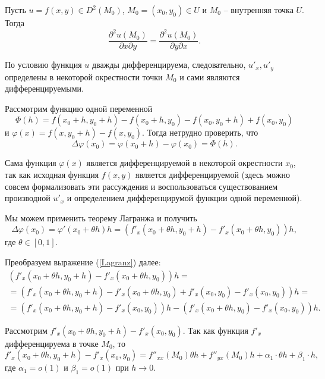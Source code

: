 	\begin{theorem}\label{th1}
		Пусть $u = f(x,y) \in D^2(M_0)$, $M_0 = (x_0, y_0) \in U$ и $M_0$ -- внутренняя точка $U$.
		Тогда
		$$
		\frac {\partial^2 u(M_0)} {\partial x \partial y} = \frac {\partial^2 u(M_0)} {\partial y \partial x}.
		$$
	\end{theorem}
	\begin{Proof}
		По условию функция $u$ дважды дифференцируема, следовательно, $u'_x, u'_y$ определены в некоторой окрестности точки $M_0$ и сами являются дифференцируемыми.
		
		Рассмотрим функцию одной переменной 
		$$
		\Phi(h) = f(x_0+h, y_0+h)-f(x_0+h, y_0)-f(x_0, y_0+h)+f(x_0, y_0)
		$$ 
		и $\varphi(x) = f(x, y_0+h)-f(x, y_0)$.
		Тогда нетрудно проверить, что 
		\begin{equation}\label{delta phi}
		\Delta\varphi(x_0) = \varphi(x_0+h) - \varphi(x_0) = \Phi(h).
		\end{equation}
		
		Сама функция $\varphi(x)$ является дифференцируемой в некоторой окрестности $x_0$, так как исходная функция $f(x, y)$ является дифференцируемой (здесь можно совсем формализовать эти рассуждения и воспользоваться существованием производной $u'_x$ и определением дифференцирумой функции одной переменной).
		
		Мы можем применить теорему Лагранжа и получить
		\begin{equation}\label{Lagranz}
		\Delta \varphi(x_0) = \varphi'(x_0+\theta h)h = (f'_x(x_0+\theta h, y_0+h) - f'_x(x_0+\theta h, y_0))h, 
		\end{equation}
		где $\theta \in [0, 1]$.
		
		Преобразуем выражение (\ref{Lagranz}) далее:
		\begin{multline*}
		\left(f'_x(x_0+\theta h, y_0+h) - f'_x(x_0+\theta h, y_0)\right)h =\\
		= (f'_x(x_0+\theta h, y_0+h) - f'_x(x_0+\theta h, y_0) + f'_x(x_0, y_0) - f'_x(x_0, y_0))h =\\
		= (f'_x(x_0+\theta h, y_0+h) - f'_x(x_0, y_0))h -(f'_x(x_0+\theta h, y_0) - f'_x(x_0, y_0))h.
		\end{multline*}
		
		Рассмотрим $f'_x(x_0+\theta h, y_0+h) - f'_x(x_0, y_0)$. Так как функция $f'_x$ дифференцируема в точке $M_0$, то
		$$
		f'_x(x_0+\theta h, y_0+h) - f'_x(x_0, y_0) = f''_{xx}(M_0)\theta h + f''_{yx}(M_0)h + \alpha_1 \cdot \theta h + \beta_1  \cdot h,
		$$
		где $\alpha_1 = o(1)$ и $\beta_1 = o(1)$ при $h\to0$.
		

\end{Proof}

